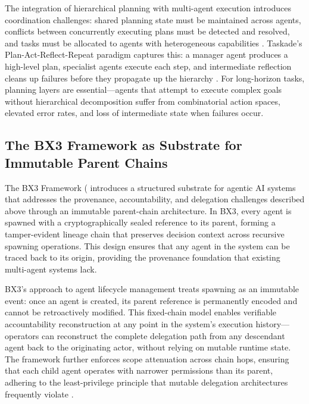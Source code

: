 The integration of hierarchical planning with multi-agent execution introduces coordination challenges: shared planning state must be maintained across agents, conflicts between concurrently executing plans must be detected and resolved, and tasks must be allocated to agents with heterogeneous capabilities \cite{zylos_htd_2026}. Taskade's Plan-Act-Reflect-Repeat paradigm captures this: a manager agent produces a high-level plan, specialist agents execute each step, and intermediate reflection cleans up failures before they propagate up the hierarchy \cite{taskade_planning_2026}. For long-horizon tasks, planning layers are essential—agents that attempt to execute complex goals without hierarchical decomposition suffer from combinatorial action spaces, elevated error rates, and loss of intermediate state when failures occur.

\subsection{The BX3 Framework as Substrate for Immutable Parent Chains}

The BX3 Framework (\cite{bxthre3_framework_2026} introduces a structured substrate for agentic AI systems that addresses the provenance, accountability, and delegation challenges described above through an immutable parent-chain architecture. In BX3, every agent is spawned with a cryptographically sealed reference to its parent, forming a tamper-evident lineage chain that preserves decision context across recursive spawning operations. This design ensures that any agent in the system can be traced back to its origin, providing the provenance foundation that existing multi-agent systems lack.

BX3's approach to agent lifecycle management treats spawning as an immutable event: once an agent is created, its parent reference is permanently encoded and cannot be retroactively modified. This fixed-chain model enables verifiable accountability reconstruction at any point in the system's execution history—operators can reconstruct the complete delegation path from any descendant agent back to the originating actor, without relying on mutable runtime state. The framework further enforces scope attenuation across chain hops, ensuring that each child agent operates with narrower permissions than its parent, adhering to the least-privilege principle that mutable delegation architectures frequently violate \cite{cloudsecurityalliance_delegation_2025}.

